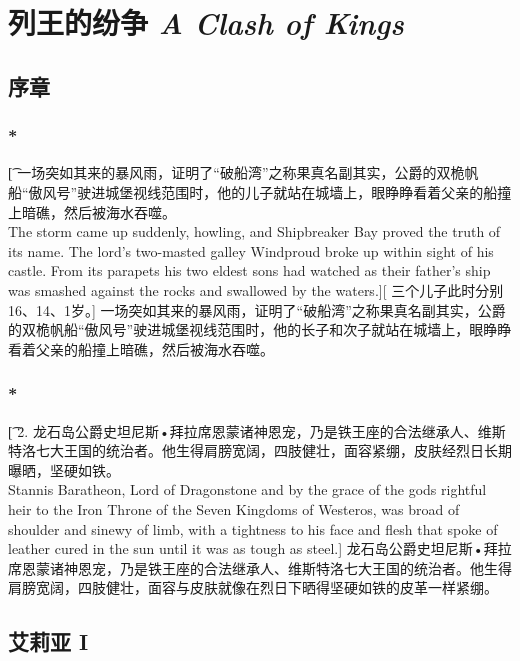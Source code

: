 \documentclass[12pt,a4paper]{article}
\begin{document}
\section{列王的纷争 \emph{A Clash of Kings}}	
\setcounter{subsection}{-1}
\subsection{序章}
\subsubsection{\color{red}*}\t[
	一场突如其来的暴风雨，证明了“破船湾”之称果真名副其实，公爵的双桅帆船“傲风号”驶进城堡视线范围时，他的儿子就站在城墙上，眼睁睁看着父亲的船撞上暗礁，然后被海水吞噬。\\
	The storm came up suddenly, howling, and Shipbreaker Bay proved the truth of its name. The lord's two-masted galley Windproud broke up within sight of his castle. From its parapets his two eldest sons had watched as their father's ship was smashed against the rocks and swallowed by the waters.][
	三个儿子此时分别16、14、1岁。]
	一场突如其来的暴风雨，证明了“破船湾”之称果真名副其实，公爵的双桅帆船“傲风号”驶进城堡视线范围时，他的长子和次子就站在城墙上，眼睁睁看着父亲的船撞上暗礁，然后被海水吞噬。
\subsubsection{\color{red}*}\t[
	2. 龙石岛公爵史坦尼斯•拜拉席恩蒙诸神恩宠，乃是铁王座的合法继承人、维斯特洛七大王国的统治者。他生得肩膀宽阔，四肢健壮，面容紧绷，皮肤经烈日长期曝晒，坚硬如铁。\\
	Stannis Baratheon, Lord of Dragonstone and by the grace of the gods rightful heir to the Iron Throne of the Seven Kingdoms of Westeros, was broad of shoulder and sinewy of limb, with a tightness to his face and flesh that spoke of leather cured in the sun until it was as tough as steel.]
	龙石岛公爵史坦尼斯•拜拉席恩蒙诸神恩宠，乃是铁王座的合法继承人、维斯特洛七大王国的统治者。他生得肩膀宽阔，四肢健壮，面容与皮肤就像在烈日下晒得坚硬如铁的皮革一样紧绷。
	
\subsection{艾莉亚 I}
\end{document}
